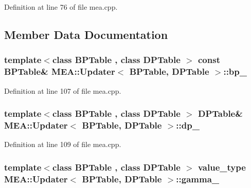 Definition at line 76 of file mea.\+cpp.



\subsection{Member Data Documentation}
\hypertarget{struct_m_e_a_1_1_updater_a49f2733a73cd8c11eff32a876d026e01}{
\subsubsection[{bp\+\_\+}]{\setlength{\rightskip}{0pt plus 5cm}template$<$class B\+P\+Table , class D\+P\+Table $>$ const {\bf B\+P\+Table}\& {\bf M\+E\+A\+::\+Updater}$<$ {\bf B\+P\+Table}, D\+P\+Table $>$\+::bp\+\_\+}}\label{struct_m_e_a_1_1_updater_a49f2733a73cd8c11eff32a876d026e01}


Definition at line 107 of file mea.\+cpp.

\hypertarget{struct_m_e_a_1_1_updater_ab78089f3d41c25887c7586de0b1e1910}{
\subsubsection[{dp\+\_\+}]{\setlength{\rightskip}{0pt plus 5cm}template$<$class B\+P\+Table , class D\+P\+Table $>$ D\+P\+Table\& {\bf M\+E\+A\+::\+Updater}$<$ {\bf B\+P\+Table}, D\+P\+Table $>$\+::dp\+\_\+}}\label{struct_m_e_a_1_1_updater_ab78089f3d41c25887c7586de0b1e1910}


Definition at line 109 of file mea.\+cpp.

\hypertarget{struct_m_e_a_1_1_updater_a098bbe27695679391e12aaf0ec72d274}{
\subsubsection[{gamma\+\_\+}]{\setlength{\rightskip}{0pt plus 5cm}template$<$class B\+P\+Table , class D\+P\+Table $>$ {\bf value\+\_\+type} {\bf M\+E\+A\+::\+Updater}$<$ {\bf B\+P\+Table}, D\+P\+Table $>$\+::gamma\+\_\+}}\label{struct_m_e_a_1_1_updater_a098bbe27695679391e12aaf0ec72d274}


